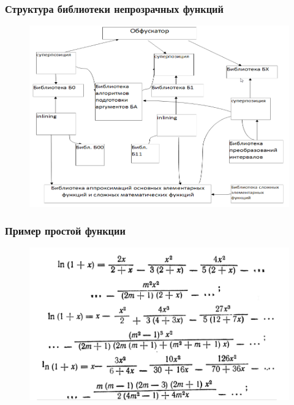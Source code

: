\documentclass[10pt]{beamer}
\begin{document}
\begin{frame}
\frametitle{Структура библиотеки непрозрачных функций}
\begin{figure}[H]
  \center
  \includegraphics[width=1.0\linewidth, height=0.9\paperheight]{FunctionLibrary.png}
\end{figure}
\end{frame}

\begin{frame}
\frametitle{Пример простой функции}
\begin{figure}[H]
  \center
  \includegraphics[width=1.0\linewidth]{Formulae.png}
\end{figure}
\end{frame}
\end{document}

